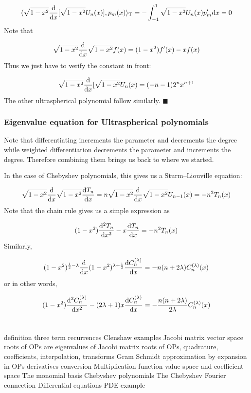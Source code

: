 \documentclass[12pt,a4paper]{article}
\def\endash{–}
\begin{document}
\[
\langle  \sqrt{1-x^2} {{\rm d} \over {\rm d}x }[\sqrt{1-x^2} U_n(x)], p_m(x)\rangle_{\rm T} = -\int_{-1}^1 \sqrt{1-x^2} U_n(x) p_m' {\rm d}x =0
\]
Note that

\[
\sqrt{1-x^2} {{\rm d} \over {\rm d}x } \sqrt{1-x^2} f(x) = (1-x^2) f'(x) - x f(x)
\]
Thus we just have to verify the constant in front:

\[
\sqrt{1-x^2} {{\rm d} \over {\rm d}x }[\sqrt{1-x^2} U_n(x) = (-n -1) 2^n x^{n+1}
\]
The other ultraspherical polynomial follow similarly. $\blacksquare$

\subsubsection{Eigenvalue equation for Ultraspherical polynomials}
Note that differentiating increments the parameter and decrements the degree while weighted differentiation decrements the parameter and increments the degree. Therefore combining them brings us back to where we started.

In the case of Chebyshev polynomials, this gives us a Sturm\ensuremath{\endash}Liouville equation:

\[
\sqrt{1-x^2} {{\rm d} \over {\rm d}x} \sqrt{1-x^2} {{\rm d} T_n \over {\rm d}x} =
n \sqrt{1-x^2} {{\rm d} \over {\rm d}x} \sqrt{1-x^2} U_{n-1}(x) = -n^2 T_n(x)
\]
Note that the chain rule gives us a simple expression as

\[
(1-x^2) {{\rm d}^2 T_n \over {\rm d}x^2} -x {{\rm d} T_n \over {\rm d}x} = -n^2 T_n(x)
\]
Similarly,

\[
(1-x^2)^{{1 \over 2} - \lambda} {{\rm d} \over {\rm d}x}(1-x^2)^{\lambda + {1 \over 2}} {{\rm d} C_n^{(\lambda)} \over {\rm d}x} = -n (n+2 \lambda) C_n^{(\lambda)}(x)
\]
or in other words,

\[
(1-x^2) {{\rm d}^2 C_n^{(\lambda)} \over {\rm d}x^2} - (2\lambda+1) x {{\rm d} C_n^{(\lambda)} \over {\rm d}x}  = -{n (n+2 \lambda) \over 2\lambda}C_n^{(\lambda)}(x)
\]

\begin{lstlisting}

\end{lstlisting}


\begin{lstlisting}

\end{lstlisting}


definition three term recurrences Clenshaw examples Jacobi matrix vector space roots of OPs are eigenvalues of Jacobi matrix roots of OPs, quadrature, coefficients, interpolation, transforms Gram Schmidt approximation by expansion in OPs derivatives conversion Multiplication function value space and coefficient space The monomial basis Chebyshev polynomials The Chebyshev Fourier connection Differential equations PDE example
\end{document}
